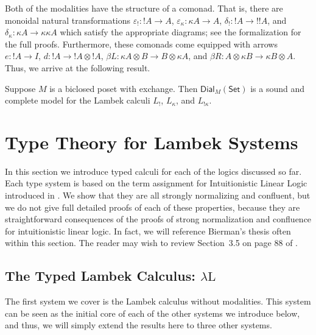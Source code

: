 \documentclass{lmcs}
\let\mto\to                     %
\let\to\relax                   %
\newcommand{\to}{\rightarrow}
\newcommand{\Set}{\mathsf{Set}}
\newcommand{\Dial}[2]{\mathsf{Dial}_{#1}(#2)}
\begin{document}
Both of the modalities have the structure of a comonad.  That is,
there are monoidal natural transformations $\varepsilon_! : !A \mto
A$, $\varepsilon_\kappa : \kappa A \mto A$, $\delta_! : !A \mto !!A$,
and $\delta_\kappa : \kappa A \mto \kappa\kappa A$ which satisfy the
appropriate diagrams; see the formalization for the full
proofs. Furthermore, these comonads come equipped with arrows $e : !A
\mto I$, $d : !A \mto !A \otimes !A$, $\beta L : \kappa A \otimes B \mto B
\otimes \kappa A$, and $\beta R : A \otimes \kappa B \mto \kappa B
\otimes A$.  Thus, we arrive at the following result.

\begin{thm}
  \label{thm:sound-dial-exchange-!}
  Suppose $M$ is a biclosed poset with exchange.  Then
  $\Dial{M}{\Set}$ is a sound and complete model for the Lambek
  calculi $L_!$, $L_\kappa$, and $L_{!\kappa}$.
\end{thm}

\section{Type Theory for Lambek Systems}
\label{sec:typed_lambek_calculi}
In this section we introduce typed calculi for each of the logics
discussed so far.  Each type system is based on the term assignment
for  Intuitionistic Linear Logic introduced 
in \cite{benton1993}.
We show that they are all strongly normalizing
and confluent, but we do not give full detailed proofs of each of
these properties, because they are straightforward consequences of the
proofs of strong normalization and confluence for intuitionistic
linear logic.  In fact, we will reference Bierman's thesis often
within this section.  The reader may wish to review Section~3.5 on
page 88 of \cite{Bierman:1994}.

\subsection{The Typed Lambek Calculus: $\lambda\text{L}$}
\label{subsec:the_typed_lambek_calculus_lambda-l}

The first system we cover is the Lambek calculus without
modalities. This system can be seen as the initial core of each of the
other systems we introduce below, and thus, we will simply extend the
results here to three other systems.  
\end{document}
